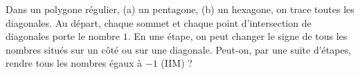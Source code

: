 Dans un polygone régulier, (a) un pentagone, (b) un hexagone, on trace toutes les diagonales. Au départ, chaque sommet et chaque point d'intersection de diagonales porte le nombre $1$. En une étape, on peut changer le signe de tous les nombres situés sur un côté ou sur une diagonale. Peut-on, par une suite d'étapes, rendre tous les nombres égaux à $-1$ (IIM) ?
